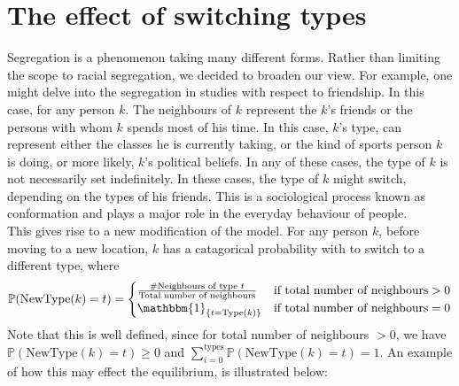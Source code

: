 \section{The effect of switching types}
\label{section:switch}
Segregation is a phenomenon taking many different forms. Rather than  limiting the scope to racial segregation, we decided to broaden our view. 
For example, one might delve into the segregation in studies with respect to friendship. 
In this case, for any person \(k\). The neighbours of \(k\) represent the \(k\)'s friends or the persons with whom \(k\) spends most of his time.
In this case, \(k\)'s type, can represent either the classes he is currently taking, or the kind of sports person \(k\) is doing, or more likely, \(k\)'s political beliefs.
In any of these cases, the type of \(k\) is not necessarily set indefinitely.
In these cases, the type of \(k\) might switch, depending on the types of his friends. This is a sociological process known as conformation and plays a major role in the everyday behaviour of people.\\

This gives rise to a new modification of the model.
For any person \(k\), before moving to a new location, \(k\) has a catagorical probability with to switch to a different type, where 
\[\mathbb{P}(\text{NewType}(k)=t) = \begin{cases} 
 \frac{\#\text{Neighbours of type }t}{\text{Total number of neighbours}}	&\mbox{if } \text{total number of neighbours}>0 \\ 
\mathbbm{1}_{\{t=\text{Type}(k)\}}   &\mbox{if } \text{total number of neighbours}=0
\end{cases}\]
Note that this is well defined, since for total number of neighbours \(> 0\), we have \( \mathbb{P}(\text{NewType}(k)=t) \geq 0\) and \(\sum_{i=0}^{\text{types}}\mathbb{P}(\text{NewType}(k)=t)=1\). An example of how this may effect the equilibrium, is illustrated below:

